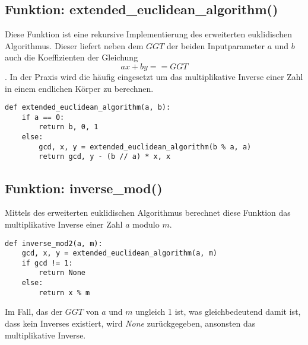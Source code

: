 \subsection{Funktion: extended\_euclidean\_algorithm()}
Diese Funktion ist eine rekursive Implementierung des erweiterten euklidischen Algorithmus. Dieser liefert neben dem $GGT$ der beiden Inputparameter $a$ und $b$ auch die Koeffizienten der Gleichung $$ax + by == GGT$$. In der Praxis wird die häufig eingesetzt um das multiplikative Inverse einer Zahl in einem endlichen Körper zu berechnen.
\vspace{\baselineskip}
\begin{lstlisting}[caption={Funktion: extended\_euclidean\_algorithm()}, captionpos=b]
def extended_euclidean_algorithm(a, b):
    if a == 0:
        return b, 0, 1
    else:
        gcd, x, y = extended_euclidean_algorithm(b % a, a)
        return gcd, y - (b // a) * x, x
\end{lstlisting}
\vspace{\baselineskip}

\subsection{Funktion: inverse\_mod()}
Mittels des erweiterten euklidischen Algorithmus berechnet diese Funktion das multiplikative Inverse einer Zahl $a$ modulo $m$.

\vspace{\baselineskip}
\begin{lstlisting}[caption={Funktion: inverse\_mod()}, captionpos=b]
def inverse_mod2(a, m):
    gcd, x, y = extended_euclidean_algorithm(a, m)
    if gcd != 1:
        return None
    else:
        return x % m
\end{lstlisting}
\vspace{\baselineskip}

Im Fall, das der $GGT$ von $a$ und $m$ ungleich 1 ist, was gleichbedeutend damit ist, dass kein Inverses existiert, wird \textit{None} zurückgegeben, ansonsten das  multiplikative Inverse.